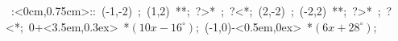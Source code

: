 \hbox{
\xy    <1cm,0cm>:<0cm,0.75cm>::
       (-1,-2) ; (1,2) **\dir{-}; ?>* \dir{>}; ?<*\dir{<}; 
       (2,-2) ; (-2,2) **\dir{-}; ?>* \dir{>}; ?<*\dir{<}; 
       0+<3.5em,0.3ex> *{\hbox{$(10x-16^{\circ})$}};
       (-1,0)-<0.5em,0ex> *{\hbox{$(6x+28^{\circ})$}};
       \endxy}
